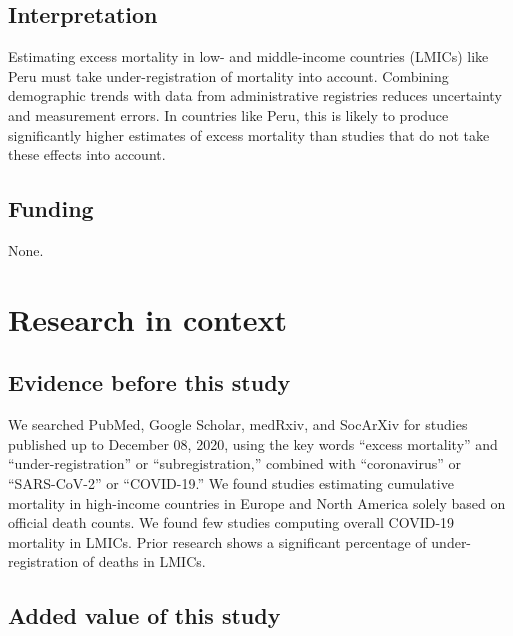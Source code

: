 \documentclass[
]{article}
\begin{document}
\hypertarget{interpretation}{%
\subsection*{Interpretation}\label{interpretation}}

Estimating excess mortality in low- and middle-income countries (LMICs) like Peru must take under-registration of mortality into account. Combining demographic trends with data from administrative registries reduces uncertainty and measurement errors. In countries like Peru, this is likely to produce significantly higher estimates of excess mortality than studies that do not take these effects into account.

\hypertarget{funding}{%
\subsection*{Funding}\label{funding}}

None.

\hypertarget{research-in-context}{%
\section*{Research in context}\label{research-in-context}}

\hypertarget{evidence-before-this-study}{%
\subsection*{Evidence before this study}\label{evidence-before-this-study}}

We searched PubMed, Google Scholar, medRxiv, and SocArXiv for studies published up to December 08, 2020, using the key words ``excess mortality'' and ``under-registration'' or ``subregistration,'' combined with ``coronavirus'' or ``SARS-CoV-2'' or ``COVID-19.'' We found studies estimating cumulative mortality in high-income countries in Europe and North America solely based on official death counts. We found few studies computing overall COVID-19 mortality in LMICs. Prior research shows a significant percentage of under-registration of deaths in LMICs.

\hypertarget{added-value-of-this-study}{%
\subsection*{Added value of this study}\label{added-value-of-this-study}}
\end{document}
